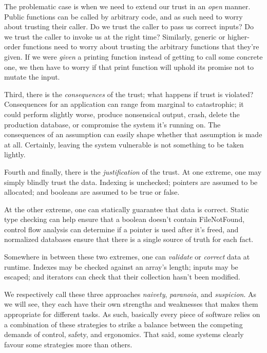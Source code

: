 The problematic case is when we need to extend our trust in an \emph{open} manner. Public
functions can be called by arbitrary code, and as such need to worry about trusting
their caller. Do we trust the caller to pass us correct inputs? Do we trust the caller
to invoke us at the right time? Similarly, generic or higher-order functions need to
worry about trusting the arbitrary functions that they're given. If we were \emph{given}
a printing function instead of getting to call some concrete
one, we then have to worry if that print function will uphold its promise not to mutate
the input.




Third, there is the \emph{consequences} of the trust; what happens if trust
is violated? Consequences for an application can range from marginal to catastrophic;
it could perform slightly worse, produce nonsensical output, crash, delete the
production database, or compromise the system it's running on.
The consequences of an assumption can easily shape whether that assumption is
made at all. Certainly, leaving the system vulnerable is not something to be
taken lightly.




Fourth and finally, there is the \emph{justification} of the trust. At one extreme, one may simply
blindly trust the data. Indexing is unchecked; pointers are assumed to be
allocated; and booleans are assumed to be true or false.

At the other extreme, one can statically guarantee that data is correct. Static
type checking can help ensure that a boolean doesn't contain FileNotFound,
control flow analysis can determine if a pointer is used after it's freed, and
normalized databases ensure that there is a single source of truth for each fact.

Somewhere in between these two extremes, one can \emph{validate} or \emph{correct} data
at runtime. Indexes may be checked against an array's length; inputs may
be escaped; and iterators can check that their collection hasn't been modified.

We respectively call these three approaches \emph{naivety}, \emph{paranoia}, and \emph{suspicion}.
As we will see, they each have their own strengths and weaknesses that makes them appropriate
for different tasks. As such, basically every piece of software relies on a combination
of these strategies to strike a balance between the competing demands of control, safety,
and ergonomics. That said, some systems clearly favour some strategies more than others.



